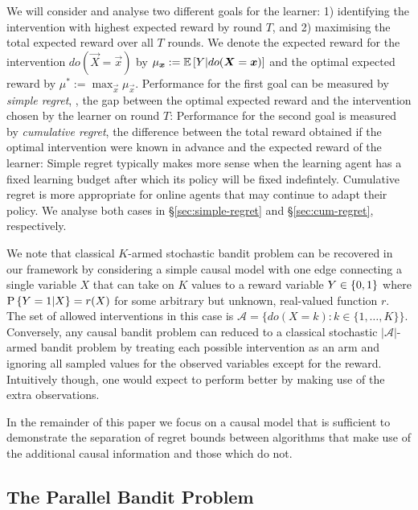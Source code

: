 We will consider and analyse two different goals for the learner: 1) identifying the intervention with highest expected reward by round $T$, and 2) maximising the total expected reward over all $T$ rounds. 
We denote the expected reward for the intervention $do(\vec{X} = \vec{x})$ by $\mu_{\vec{x}} := \E{Y | do(\vec{X} = \vec{x})}$ and the optimal expected reward by $\mu^* := \max_{\vec{x}} \mu_{\vec{x}}$.
Performance for the first goal can be measured by \emph{simple regret}, \ie, the gap between the optimal expected reward and the intervention chosen by the learner on round $T$:
Performance for the second goal is measured by \emph{cumulative regret}, the difference between the total reward obtained if the optimal intervention were known in advance and the expected reward of the learner:
Simple regret typically makes more sense when the learning agent has a fixed learning budget after which its policy will be fixed indefintely. 
Cumulative regret is more appropriate for online agents that may continue to adapt their policy. 
We analyse both cases in \S\ref{sec:simple-regret} and \S\ref{sec:cum-regret}, respectively.

We note that classical $K$-armed stochastic bandit problem can be recovered in our framework by considering a simple causal model with one edge connecting a single variable $X$ that can take on $K$ values to a reward variable $Y \in \set{0,1}$ where $\P{Y = 1|X} = r(X)$ for some arbitrary but unknown, real-valued function $r$.
The set of allowed interventions in this case is $\mathcal{A} = \{ do(X = k) \colon k \in \{1, \ldots, K\}\}$.
Conversely, any causal bandit problem can reduced to a classical stochastic $|\mathcal{A}|$-armed bandit problem by treating each possible intervention as an arm and ignoring all sampled values for the observed variables except for the reward.
Intuitively though, one would expect to perform better by making use of the extra observations.

In the remainder of this paper we focus on a causal model that is sufficient to demonstrate the separation of regret bounds between algorithms that make use of the additional causal information and those which do not.



\subsection{The Parallel Bandit Problem}

